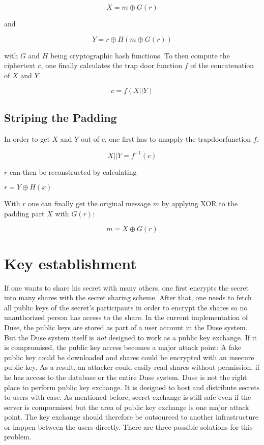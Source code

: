 $$X = m \oplus G(r)$$

and

$$Y = r \oplus H(m \oplus G(r))$$

with $G$ and $H$ being cryptographic hash functions. To then compute the
ciphertext $c$, one finally calculates the trap door function $f$ of the
concatenation of $X$ and $Y$

$$c = f(X || Y)$$

\subsection{Striping the Padding}

In order to get $X$ and $Y$ out of $c$, one first has to unapply the
trapdoorfunction $f$.

$$X || Y = f^{-1}(c)$$

$r$ can then be reconstructed by calculating

$r = Y \oplus H(x)$

With $r$ one can finally get the original message $m$ by applying XOR
to the padding part $X$ with $G(r)$:

$$m = X \oplus G(r)$$

\section{Key establishment}

If one wants to share his secret with many others, one first encrypts the
secret into many shares with the secret sharing scheme. After that, one needs
to fetch all public keys of the secret's participants in order to encrypt the
shares so no unauthorized person has access to the share. In the current
implementation of Duse, the public keys are stored as part of a user account
in the Duse system. But the Duse system itself is \textit{not} designed to
work as a public key exchange. If it is compromised, the public key access
becomes a major attack point: A fake public key could be downloaded and shares
could be encrypted with an insecure public key. As a result, an attacker
could easily read shares without permission, if he has access to the database
or the entire Duse system. Duse is not the right place to perform public
key exchange. It is designed to host and distribute secrets to users with ease.
As mentioned before, secret exchange is still safe even if the server is compormised
but the area of public key exchange is one major attack point.
The key exchange should therefore be outsourced to another
infrastructure or happen between the users directly. There are three possible
solutions for this problem.


